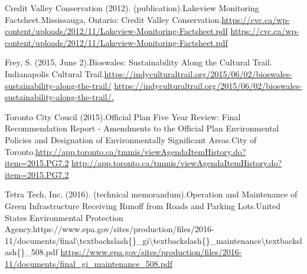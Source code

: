 \documentclass[letter]{ourGreenwayBrand}
\begin{document}
\hspace{1em}Credit Valley Conservation (2012). (publication).Lakeview Monitoring Factsheet.Mississauga, Ontario: Credit Valley Conservation.\url{https://cvc.ca/wp-content/uploads/2012/11/Lakeview-Monitoring-Factsheet.pdf} \url{https://cvc.ca/wp-content/uploads/2012/11/Lakeview-Monitoring-Factsheet.pdf}

\hspace{1em}Frey, S. (2015, June 2).Bioswales: Sustainability Along the Cultural Trail. Indianapolis Cultural Trail.\url{https://indyculturaltrail.org/2015/06/02/bioswales-sustainability-along-the-trail/} \url{https://indyculturaltrail.org/2015/06/02/bioswales-sustainability-along-the-trail/.}

\hspace{1em}Toronto City Coucil (2015).Official Plan Five Year Review: Final Recommendation Report - Amendments to the Official Plan Environmental Policies and Designation of Environmentally Significant Areas.City of Toronto.\url{http://app.toronto.ca/tmmis/viewAgendaItemHistory.do?item=2015.PG7.2} \url{http://app.toronto.ca/tmmis/viewAgendaItemHistory.do?item=2015.PG7.2}

\hspace{1em}Tetra Tech, Inc. (2016). (technical memorandum).Operation and Maintenance of Green Infrastructure Receiving Runoff from Roads and Parking Lots.United States Environmental Protection Agency.https://www.epa.gov/sites/production/files/2016-11/documents/final\textbackslash{}textbackslash\{\}\_gi\textbackslash{}textbackslash\{\}\_maintenance\textbackslash{}textbackslash\{\}\_508.pdf \url{https://www.epa.gov/sites/production/files/2016-11/documents/final_gi_maintenance_508.pdf}

\vspace{2em}
\end{document}
